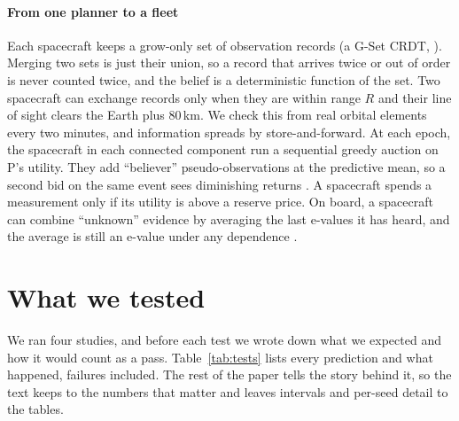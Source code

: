 \documentclass[final,5p,times,twocolumn,authoryear]{elsarticle}
\begin{document}
\paragraph{From one planner to a fleet} Each spacecraft keeps a grow-only set of observation records (a G-Set CRDT, \citealp{Shapiro2011}). Merging two sets is just their union, so a record that arrives twice or out of order is never counted twice, and the belief is a deterministic function of the set. Two spacecraft can exchange records only when they are within range $R$ and their line of sight clears the Earth plus 80\,km. We check this from real orbital elements every two minutes, and information spreads by store-and-forward. At each epoch, the spacecraft in each connected component run a sequential greedy auction on P's utility. They add ``believer'' pseudo-observations at the predictive mean, so a second bid on the same event sees diminishing returns \citep{Ginsbourger2010}. A spacecraft spends a measurement only if its utility is above a reserve price. On board, a spacecraft can combine ``unknown'' evidence by averaging the last e-values it has heard, and the average is still an e-value under any dependence \citep{VovkWang2021}.

\section{What we tested}\label{sec:tests}
We ran four studies, and before each test we wrote down what we expected and how it would count as a pass. Table~\ref{tab:tests} lists every prediction and what happened, failures included. The rest of the paper tells the story behind it, so the text keeps to the numbers that matter and leaves intervals and per-seed detail to the tables.
\end{document}
